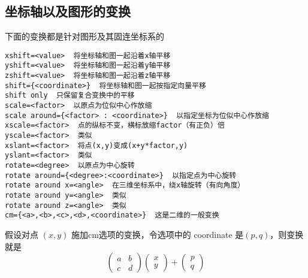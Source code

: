 \documentclass[UTF8]{ctexart}
\begin{document}





\subsection{ 坐标轴以及图形的变换 }

下面的变换都是针对图形及其固连坐标系的
\begin{lstlisting}
xshift=<value>  将坐标轴和图一起沿着x轴平移
yshift=<value>  将坐标轴和图一起沿着y轴平移
zshift=<value>  将坐标轴和图一起沿着z轴平移
shift={<coordinate>}  将坐标轴和图一起按指定向量平移
shift only  只保留复合变换中的平移
scale=<factor>  以原点为位似中心作放缩
scale around={<factor> : <coordinate>}  以指定坐标为位似中心作放缩
xscale=<factor>  点的纵标不变，横标放缩factor（有正负）倍
yscale=<factor>  类似
xslant=<factor>  将点(x,y)变成(x+y*factor,y)
yslant=<factor>  类似
rotate=<degree>  以原点为中心旋转
rotate around={<degree>:<coordinate>}  以指定点为中心旋转
rotate around x=<angle>  在三维坐标系中，绕x轴旋转（有向角度）
rotate around y=<angle>  类似
rotate around z=<angle>  类似
cm={<a>,<b>,<c>,<d>,<coordinate>}  这是二维的一般变换
\end{lstlisting}

假设对点 $(x,y)$ 施加cm选项的变换，令选项中的 coordinate 是$(p,q)$，则变换就是
\[
\begin{pmatrix}
a & b \\
c & d
\end{pmatrix}
\begin{pmatrix}
x \\
y
\end{pmatrix} + 
\begin{pmatrix}
p \\
q
\end{pmatrix}
\]
\end{document}
